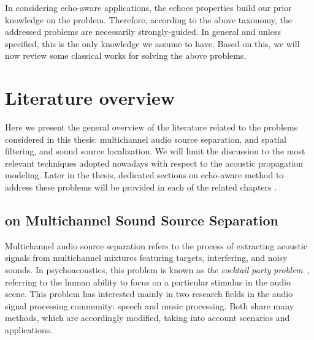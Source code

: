 \mynewline
In considering echo-aware applications, the echoes properties build our prior knowledge on the problem.
Therefore, according to the above taxonomy, the addressed problems are necessarily strongly-guided.
In general and unless specified, this is the only knowledge we assume to have.
Based on this, we will now review some classical works for solving the above problems.


\section{Literature overview}\label{sec:application:sota}
Here we present the general overview of the literature related to the problems considered in this thesis: multichannel audio source separation, and spatial filtering, and sound source localization.
We will limit the discussion to the most relevant techniques adopted nowadays with respect to the acoustic propagation modeling.
Later in the thesis, dedicated sections on echo-aware method to address these problems will be provided in each of the related chapters .


\subsection{on Multichannel Sound Source Separation}\label{subsec:application:separation}
Multichannel audio source separation refers to the process of extracting acoustic signals from multichannel mixtures featuring targets, interfering, and noisy sounds.
In psychoacoustics, this problem is known as \textit{the cocktail party problem}~, referring to the human ability to focus on a particular stimulus in the audio scene.
This problem has interested mainly in two research fields in the audio signal processing community: speech and music processing.
Both share many methods, which are accordingly modified, taking into account scenarios and applications.

